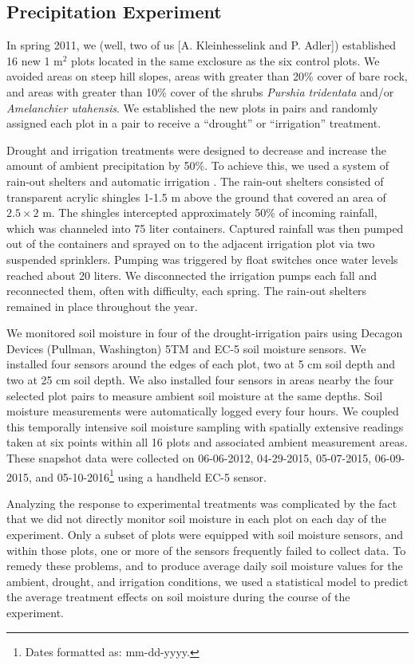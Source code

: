 \documentclass[fleqn,10pt,lineno]{wlpeerj} %
\begin{document}
\subsection{Precipitation Experiment}\label{precipitation-experiment}

In spring 2011, we (well, two of us {[}A. Kleinhesselink and P.
Adler{]}) established 16 new 1 m\(^2\) plots located in the same
exclosure as the six control plots. We avoided areas on steep hill
slopes, areas with greater than 20\% cover of bare rock, and areas with
greater than 10\% cover of the shrubs \emph{Purshia tridentata} and/or
\emph{Amelanchier utahensis}. We established the new plots in pairs and
randomly assigned each plot in a pair to receive a ``drought'' or
``irrigation'' treatment.

Drought and irrigation treatments were designed to decrease and increase
the amount of ambient precipitation by 50\%. To achieve this, we used a
system of rain-out shelters and automatic irrigation
\citep{Gherardi2013}. The rain-out shelters consisted of transparent
acrylic shingles 1-1.5 m above the ground that covered an area of
\(2.5\times2\) m. The shingles intercepted approximately 50\% of
incoming rainfall, which was channeled into 75 liter containers.
Captured rainfall was then pumped out of the containers and sprayed on
to the adjacent irrigation plot via two suspended sprinklers. Pumping
was triggered by float switches once water levels reached about 20
liters. We disconnected the irrigation pumps each fall and reconnected
them, often with difficulty, each spring. The rain-out shelters remained
in place throughout the year.

We monitored soil moisture in four of the drought-irrigation pairs using
Decagon Devices (Pullman, Washington) 5TM and EC-5 soil moisture
sensors. We installed four sensors around the edges of each plot, two at
5 cm soil depth and two at 25 cm soil depth. We also installed four
sensors in areas nearby the four selected plot pairs to measure ambient
soil moisture at the same depths. Soil moisture measurements were
automatically logged every four hours. We coupled this temporally
intensive soil moisture sampling with spatially extensive readings taken
at six points within all 16 plots and associated ambient measurement
areas. These snapshot data were collected on 06-06-2012, 04-29-2015,
05-07-2015, 06-09-2015, and
05-10-2016\footnote{Dates formatted as: mm-dd-yyyy.} using a handheld
EC-5 sensor.

Analyzing the response to experimental treatments was complicated by the
fact that we did not directly monitor soil moisture in each plot on each
day of the experiment. Only a subset of plots were equipped with soil
moisture sensors, and within those plots, one or more of the sensors
frequently failed to collect data. To remedy these problems, and to
produce average daily soil moisture values for the ambient, drought, and
irrigation conditions, we used a statistical model to predict the
average treatment effects on soil moisture during the course of the
experiment.
\end{document}
